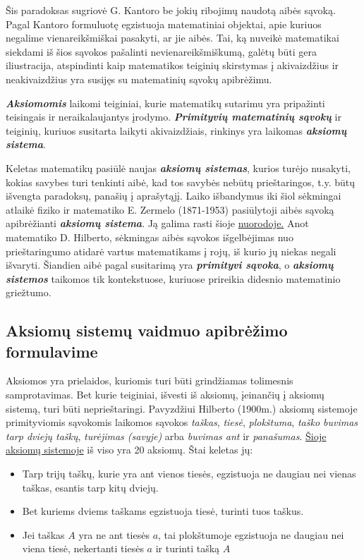 \documentclass{article}
\begin{document}
Šis paradoksas sugriovė G. Kantoro be jokių ribojimų naudotą aibės sąvoką. Pagal Kantoro formuluotę egzistuoja matematiniai objektai, apie kuriuos negalime vienareikšmiškai pasakyti, ar jie aibės. Tai, ką nuveikė matematikai siekdami iš šios sąvokos pašalinti nevienareikšmiškumą, galėtų būti gera iliustracija, atspindinti kaip matematikos teiginių skirstymas į akivaizdžius ir neakivaizdžius yra susijęs su matematinių sąvokų apibrėžimu.

\begin{mdframed}[backgroundcolor=blue!10!white, linewidth=3pt]
\textit{\textbf{Aksiomomis}} laikomi teiginiai, kurie matematikų sutarimu yra pripažinti teisingais ir neraikalaujantys įrodymo. 
\textit{\textbf{Primityvių matematinių sąvokų}} ir teiginių, kuriuos susitarta laikyti akivaizdžiais, rinkinys yra laikomas \textit{\textbf{aksiomų sistema}}.\\
\end{mdframed}

Keletas matematikų pasiūlė naujas \textit{\textbf{aksiomų sistemas}}, kurios turėjo nusakyti, kokias savybes turi tenkinti aibė, kad tos savybės nebūtų prieštaringos, t.y. būtų išvengta paradoksų, panašių į aprašytąjį. Laiko išbandymus iki šiol sėkmingai atlaikė fiziko ir matematiko E. Zermelo (1871-1953) pasiūlytoji aibės sąvoką apibrėžianti \textit{\textbf{aksiomų sistema}}. Ją galima rasti šioje \href{http://www.math.tamu.edu/\~boas/courses/220-2003c/nov14.pdf}{nuorodoje.} Anot matematiko D. Hilberto, sėkmingas aibės sąvokos išgelbėjimas nuo prieštaringumo atidarė vartus matematikams į rojų, iš kurio jų niekas negali išvaryti. Šiandien aibė pagal susitarimą yra \textit{\textbf{primityvi sąvoka}}, o \textit{\textbf{aksiomų sistemos}} taikomos tik kontekstuose, kuriuose prireikia didesnio matematinio griežtumo.

\subsection{Aksiomų sistemų vaidmuo apibrėžimo formulavime}

Aksiomos yra prielaidos, kuriomis turi būti grindžiamas tolimesnis samprotavimas. Bet kurie teiginiai, išvesti iš aksiomų, įeinančių į aksiomų sistemą, turi būti neprieštaringi.  Pavyzdžiui Hilberto (1900m.) aksiomų sistemoje primityviomis sąvokomis laikomos sąvokos \textit{taškas}, \textit{tiesė}, \textit{plokštuma}, \textit{taško buvimas tarp dviejų taškų}, \textit{turėjimas (savyje)} arba \textit{buvimas ant} ir \textit{panašumas}. \href{http://folk.uio.no/bjoernj/kurs/4510/hilberteng.pdf}{Šioje aksiomų sistemoje} iš viso yra 20 aksiomų. Štai keletas jų:
\begin{itemize}
\item Tarp trijų taškų, kurie yra ant vienos tiesės, egzistuoja ne daugiau nei vienas taškas, esantis tarp kitų dviejų.
\item Bet kuriems dviems taškams egzistuoja tiesė, turinti tuos taškus.
\item Jei taškas $A$ yra ne ant tiesės $a$, tai plokštumoje egzistuoja ne daugiau nei viena tiesė, nekertanti tiesės $a$ ir turinti tašką $A$
\end{itemize} 
\end{document}
